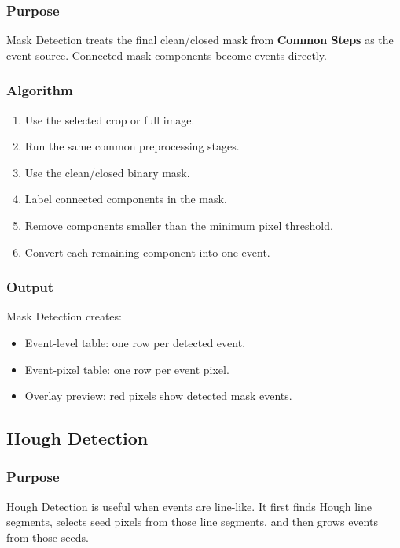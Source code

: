 \documentclass[11pt]{article}
\newcommand{\ui}[1]{\textbf{#1}}
\begin{document}
\subsubsection{Purpose}

Mask Detection treats the final clean/closed mask from \ui{Common Steps} as the event source. Connected mask components become events directly.

\subsubsection{Algorithm}

\begin{enumerate}
    \item Use the selected crop or full image.
    \item Run the same common preprocessing stages.
    \item Use the clean/closed binary mask.
    \item Label connected components in the mask.
    \item Remove components smaller than the minimum pixel threshold.
    \item Convert each remaining component into one event.
\end{enumerate}

\subsubsection{Output}

Mask Detection creates:

\begin{itemize}
    \item Event-level table: one row per detected event.
    \item Event-pixel table: one row per event pixel.
    \item Overlay preview: red pixels show detected mask events.
\end{itemize}

\subsection{Hough Detection}

\subsubsection{Purpose}

Hough Detection is useful when events are line-like. It first finds Hough line segments, selects seed pixels from those line segments, and then grows events from those seeds.
\end{document}

